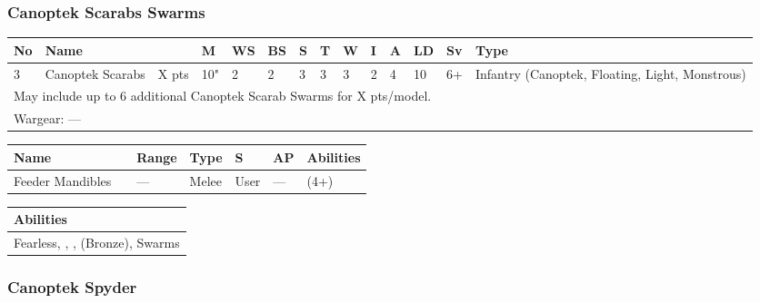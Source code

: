 \newpage
\subsubsection{Canoptek Scarabs Swarms}

\noindent
\begin{tabular}{||m{10pt} m{95pt} m{30pt} m{11pt} m{11pt} m{11pt} m{11pt} m{11pt} m{11pt} m{11pt} m{11pt} m{11pt} m{11pt} m{125pt}||}
	\hline
	No & Name & & M & WS & BS & S & T & W & I & A & LD & Sv & Type \\
	\hline
	3 & Canoptek Scarabs & X pts & 10" & 2 & 2 & 3 & 3 & 3 & 2 & 4 & 10 & 6+ & Infantry (Canoptek, Floating, Light, Monstrous)\\
	\hline
	\hline
	\multicolumn{14}{||Z{532 pt}||}{May include up to 6 additional Canoptek Scarab Swarms for X pts/model.}\\		
	\hline
	\hline
	\multicolumn{14}{||Z{532 pt}||}{Wargear: —}\\
	\hline
\end{tabular}

\noindent
\begin{tabular}{||m{110pt} m{30pt} m{31pt} m{55pt} m{12pt} m{12pt} m{210pt}||}
	\hline
	Name & & Range & Type & S & AP & Abilities \\
	\hline
	Feeder Mandibles & & — & Melee & User & — & \quickref{Entropic Strike} (4+) \\
	\hline
\end{tabular}

\noindent
\begin{tabular}{||m{532pt}||}
	\hline
	Abilities \\
	\hline
	Fearless, \quickref{Living Metal}, \quickref{Reanimation Protocols}, \quickref{Soulless Hordes} (Bronze), Swarms \\
	\hline
\end{tabular}


\newpage
\subsubsection{Canoptek Spyder}

